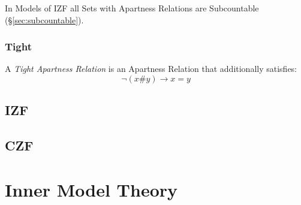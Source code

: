 In Models of IZF all Sets with Apartness Relations are Subcountable
(\S\ref{sec:subcountable}).



\subsubsection{Tight}\label{sec:tight}

A \emph{Tight Apartness Relation} is an Apartness Relation that
additionally satisfies:
\[
  \neg (x \# y) \rightarrow x = y
\]



\subsection{IZF}\label{sec:izf}

\subsection{CZF}\label{sec:czf}



\section{Inner Model Theory}\label{sec:inner_model_theory}
